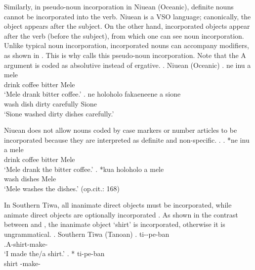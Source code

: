 Similarly, in pseudo-noun incorporation in Niuean (Oceanic),
definite nouns cannot be incorporated into the verb.
Niuean is a VSO language;
canonically, the object appears after the subject.
On the other hand,
incorporated objects appear after the verb (before the subject),
from which one can see noun incorporation.
Unlike typical noun incorporation,
incorporated nouns can accompany modifiers,
as shown in \Next.
This is why  calls this pseudo-noun incorporation.
Note that the A argument  is coded as absolutive instead of ergative.
%
\ex. Niuean (Oceanic)
 \ag. ne inu   a mele \\
       drink coffee bitter  Mele \\
      `Mele drank bitter coffee.'
 \bg. ne holoholo   fakaeneene a sione \\
       wash dish dirty carefully  Sione \\
      `Sione washed dirty dishes carefully.'
  \hfill{\cite[158]{massam01}}

Niuean does not allow nouns coded by case markers or number articles
to be incorporated
because they are interpreted as definite and non-specific.
%
\ex.
 \ag. *ne inu    a mele \\
       drink  coffee bitter  Mele \\
      `Mele drank the bitter coffee.'
 \bg. *kua holoholo   a mele \\
        wash  dishes  Mele \\
       `Mele washes the dishes.'
 \hfill{(op.cit.: 168)}

In Southern Tiwa,
all inanimate direct objects must be incorporated,
while animate direct objects are optionally incorporated \cite{allenetal84}.
As shown in the contrast between \Next[a] and \Next[b],
the inanimate object  `shirt' is incorporated,
otherwise it is ungrammatical.
%
\ex. Southern Tiwa (Tanoan)
 \ag. ti--pe-ban \\
      .{\sc A}-shirt-make-\\
      `I made the/a shirt.'
 \bg. * ti-pe-ban \\
      shirt -make-\\
      \hfill{\cite[293]{allenetal84}}

